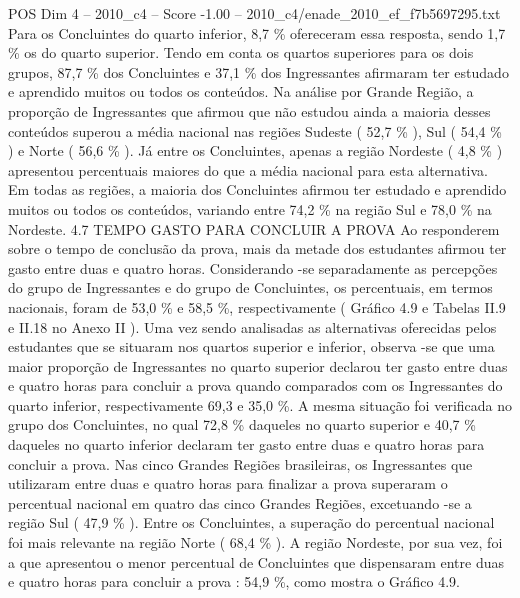 \begin{textsample}{POS Dim 4 – 2010\_c4 – Score -1.00 – 2010\_c4/enade\_2010\_ef\_f7b5697295.txt}
Para os Concluintes do quarto inferior, 8,7 \% ofereceram essa resposta, sendo 1,7 \% os do quarto superior.
Tendo em conta os quartos superiores para os dois grupos, 87,7 \% dos Concluintes e 37,1 \% dos Ingressantes afirmaram ter estudado e aprendido muitos ou todos os conteúdos.
Na análise por Grande Região, a proporção de Ingressantes que afirmou que não estudou ainda a maioria desses conteúdos superou a média nacional nas regiões Sudeste ( 52,7 \% ), Sul ( 54,4 \% ) e Norte ( 56,6 \% ).
Já entre os Concluintes, apenas a região Nordeste ( 4,8 \% ) apresentou percentuais maiores do que a média nacional para esta alternativa.
Em todas as regiões, a maioria dos Concluintes afirmou ter estudado e aprendido muitos ou todos os conteúdos, variando entre 74,2 \% na região Sul e 78,0 \% na Nordeste. 4.7 TEMPO GASTO PARA CONCLUIR A PROVA Ao responderem sobre o tempo de conclusão da prova, mais da metade dos estudantes afirmou ter gasto entre duas e quatro horas.
Considerando -se separadamente as percepções do grupo de Ingressantes e do grupo de Concluintes, os percentuais, em termos nacionais, foram de 53,0 \% e 58,5 \%, respectivamente ( Gráfico 4.9 e Tabelas II.9 e II.18 no Anexo II ).
Uma vez sendo analisadas as alternativas oferecidas pelos estudantes que se situaram nos quartos superior e inferior, observa -se que uma maior proporção de Ingressantes no quarto superior declarou ter gasto entre duas e quatro horas para concluir a prova quando comparados com os Ingressantes do quarto inferior, respectivamente 69,3 e 35,0 \%.
A mesma situação foi verificada no grupo dos Concluintes, no qual 72,8 \% daqueles no quarto superior e 40,7 \% daqueles no quarto inferior declaram ter gasto entre duas e quatro horas para concluir a prova.
Nas cinco Grandes Regiões brasileiras, os Ingressantes que utilizaram entre duas e quatro horas para finalizar a prova superaram o percentual nacional em quatro das cinco Grandes Regiões, excetuando -se a região Sul ( 47,9 \% ).
Entre os Concluintes, a superação do percentual nacional foi mais relevante na região Norte ( 68,4 \% ).
A região Nordeste, por sua vez, foi a que apresentou o menor percentual de Concluintes que dispensaram entre duas e quatro horas para concluir a prova : 54,9 \%, como mostra o Gráfico 4.9.

\end{textsample}

